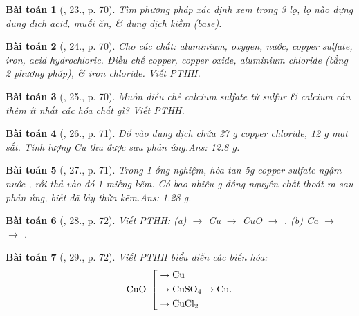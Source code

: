 \documentclass{article}
\newtheorem{baitoan}{Bài toán}
\begin{document}
\begin{baitoan}[\cite{An_Hoa_Hoc_nang_cao_8_9}, 23., p. 70]
	Tìm phương pháp xác định xem trong 3 lọ, lọ nào đựng dung dịch acid, muối ăn, \& dung dịch kiềm (base).
\end{baitoan}

\begin{baitoan}[\cite{An_Hoa_Hoc_nang_cao_8_9}, 24., p. 70]
	Cho các chất: aluminium, oxygen, nước, copper sulfate, iron, acid hydrochloric. Điều chế copper, copper oxide, aluminium chloride (bằng 2 phương pháp), \& iron chloride. Viết {\rm PTHH}.
\end{baitoan}

\begin{baitoan}[\cite{An_Hoa_Hoc_nang_cao_8_9}, 25., p. 70]
	Muốn điều chế calcium sulfate từ sulfur \& calcium cần thêm ít nhất các hóa chất gì? Viết {\rm PTHH}.
\end{baitoan}

\begin{baitoan}[\cite{An_Hoa_Hoc_nang_cao_8_9}, 26., p. 71]
	Đổ vào dung dịch chứa {\rm27 g} copper chloride, {\rm12 g} mạt sắt. Tính lượng {\rm Cu} thu được sau phản ứng.\hfill{\sf Ans: 12.8 g.}
\end{baitoan}

\begin{baitoan}[\cite{An_Hoa_Hoc_nang_cao_8_9}, 27., p. 71]
	Trong 1 ống nghiệm, hòa tan {\rm5g} copper sulfate ngậm nước {\rm{}}, rồi thả vào đó 1 miếng kẽm. Có bao nhiêu {\rm g} đồng nguyên chất thoát ra sau phản ứng, biết đã lấy thừa kẽm.\hfill{\sf Ans: 1.28 g.}
\end{baitoan}

\begin{baitoan}[\cite{An_Hoa_Hoc_nang_cao_8_9}, 28., p. 72]
	Viết {\rm PTHH}: (a) {\rm{} $\to$ Cu $\to$ CuO $\to$ }. (b) {\rm Ca $\to$  $\to$ }.
\end{baitoan}

\begin{baitoan}[\cite{An_Hoa_Hoc_nang_cao_8_9}, 29., p. 72]
	Viết {\rm PTHH} biểu diễn các biến hóa: 
	\begin{equation*}
		{\rm CuO}\ \left[\begin{split}
			&\to{\rm Cu}\\
			&\to\ce{CuSO4}\to{\rm Cu}.\\
			&\to\ce{CuCl2}
		\end{split}\right.
	\end{equation*}
\end{baitoan}
\end{document}
